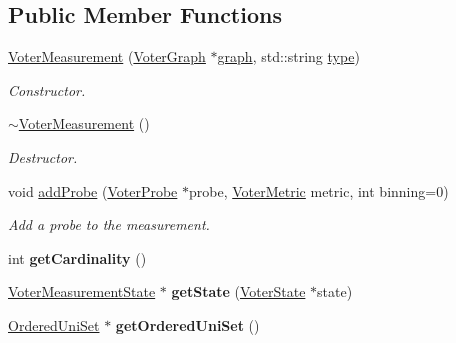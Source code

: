 \subsection*{Public Member Functions}
\begin{DoxyCompactItemize}
\item 
\hyperlink{classVoterMeasurement_a0668249876e48af0ae246a554b30195c}{Voter\-Measurement} (\hyperlink{classVoterGraph}{Voter\-Graph} $\ast$\hyperlink{classVoterMeasurement_a8d22d4b78f7e2f4c747f5716c4885351}{graph}, std\-::string \hyperlink{classVoterMeasurement_ad4471a133827f052622a84c4a451aabe}{type})
\begin{DoxyCompactList}\small\item\em Constructor. \end{DoxyCompactList}\item 
\hypertarget{classVoterMeasurement_a2cbd2d015fad1579c21dc62dd2511fe6}{\hyperlink{classVoterMeasurement_a2cbd2d015fad1579c21dc62dd2511fe6}{$\sim$\-Voter\-Measurement} ()}\label{classVoterMeasurement_a2cbd2d015fad1579c21dc62dd2511fe6}

\begin{DoxyCompactList}\small\item\em Destructor. \end{DoxyCompactList}\item 
void \hyperlink{classVoterMeasurement_a4dc0ed5870875acb3a8651ca25ff2b74}{add\-Probe} (\hyperlink{classVoterProbe}{Voter\-Probe} $\ast$probe, \hyperlink{voter__graph_8hpp_acb4c45a5ce4a55eee28e54e60409b9c5}{Voter\-Metric} metric, int binning=0)
\begin{DoxyCompactList}\small\item\em Add a probe to the measurement. \end{DoxyCompactList}\item 
\hypertarget{classVoterMeasurement_a43a426ee79a1e1a91cf1bf148309a746}{int {\bfseries get\-Cardinality} ()}\label{classVoterMeasurement_a43a426ee79a1e1a91cf1bf148309a746}

\item 
\hypertarget{classVoterMeasurement_a671dc85ea1e4912705905f8d5b3e1538}{\hyperlink{classVoterMeasurementState}{Voter\-Measurement\-State} $\ast$ {\bfseries get\-State} (\hyperlink{classVoterState}{Voter\-State} $\ast$state)}\label{classVoterMeasurement_a671dc85ea1e4912705905f8d5b3e1538}

\item 
\hypertarget{classVoterMeasurement_af98d474992d62273b18d1fd5cd02b670}{\hyperlink{classOrderedUniSet}{Ordered\-Uni\-Set} $\ast$ {\bfseries get\-Ordered\-Uni\-Set} ()}\label{classVoterMeasurement_af98d474992d62273b18d1fd5cd02b670}


\end{DoxyCompactItemize}
